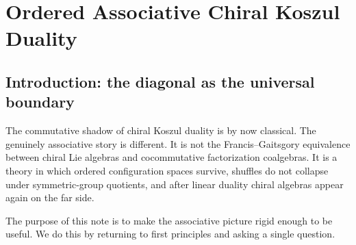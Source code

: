 
\providecommand{\Assch}{\mathrm{Ass}^{\mathrm{ch}}}
\providecommand{\Barch}{\overline{B}^{\mathrm{ch}}}
\providecommand{\Cobar}{\Omega^{\mathrm{ch}}}
\providecommand{\coHoch}{\operatorname{coHH}}
\providecommand{\Cotor}{\operatorname{Cotor}}
\providecommand{\Coext}{\operatorname{Coext}}
\providecommand{\RHom}{R\!\operatorname{Hom}}
\providecommand{\Tot}{\operatorname{Tot}}
\providecommand{\KK}{\mathbb{K}}
\providecommand{\Dpbw}{D^{\mathrm{pbw}}}
\providecommand{\Dco}{D^{\mathrm{co}}}
\providecommand{\chotimes}{\mathbin{\otimes^{\mathrm{ch}}}}
\providecommand{\wt}{\widetilde}
\providecommand{\eps}{\varepsilon}
\providecommand{\susp}{s}
\providecommand{\coeq}{\operatorname{coeq}}
\providecommand{\id}{\mathrm{id}}
\providecommand{\op}{\mathrm{op}}
\providecommand{\cop}{\mathrm{cop}}
\providecommand{\HH}{\operatorname{HH}}
\providecommand{\Tor}{\operatorname{Tor}}
\providecommand{\Ext}{\operatorname{Ext}}
\providecommand{\gr}{\operatorname{gr}}
\providecommand{\MC}{\operatorname{MC}}
\providecommand{\Ob}{\operatorname{Ob}}
\providecommand{\eq}{\operatorname{eq}}
\providecommand{\cF}{\mathcal{F}}
\providecommand{\cL}{\mathcal{L}}
\providecommand{\cA}{\mathcal{A}}

\chapter{Ordered Associative Chiral Koszul Duality}

\section{Introduction: the diagonal as the universal boundary}

The commutative shadow of chiral Koszul duality is by now classical. The genuinely associative
story is different. It is not the Francis--Gaitsgory equivalence between chiral Lie algebras and
cocommutative factorization coalgebras. It is a theory in which ordered configuration spaces
survive, shuffles do not collapse under symmetric-group quotients, and after linear duality
chiral algebras appear again on the far side.

The purpose of this note is to make the associative picture rigid enough to be useful. We do this
by returning to first principles and asking a single question.

